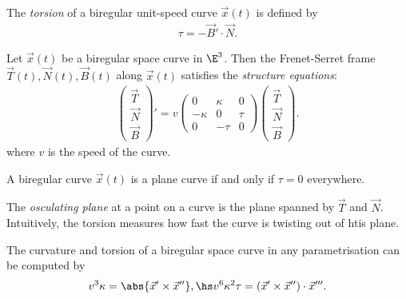 \documentclass{article}
\begin{document}
\begin{definition}
    The \emph{torsion} of a biregular unit-speed curve $\vec x(t)$ is defined by
    \begin{align*}
        \tau = - \vec B' \cdot \vec N.
    \end{align*}
\end{definition}

\begin{theorem}
    Let $\vec x(t)$ be a biregular space curve in $\E^3$. Then the Frenet-Serret
    frame $\vec T(t), \vec N(t), \vec B(t)$ along $\vec x(t)$ satisfies the
    \emph{structure equations}:
    \begin{align*}
        \begin{pmatrix}
            \vec T \\
            \vec N \\
            \vec B
        \end{pmatrix}'
        = v\begin{pmatrix}
            0       & \kappa & 0    \\
            -\kappa & 0      & \tau \\
            0       & -\tau  & 0
        \end{pmatrix}
        \begin{pmatrix}
            \vec T \\
            \vec N \\
            \vec B
        \end{pmatrix}.
    \end{align*}
    where $v$ is the speed of the curve.
\end{theorem}

\begin{theorem}
    A biregular curve $\vec x(t)$ is a plane curve if and only if $\tau=0$ everywhere.
\end{theorem}

\begin{definition}
    The \emph{osculating plane} at a point on a curve is the plane spanned by $\vec T$ and
    $\vec N$. Intuitively, the torsion measures how fast the curve is twisting out of htis plane.
\end{definition}

\begin{theorem}
    The curvature and torsion of a biregular space curve in any parametrisation can be
    computed by
    \begin{align*}
        v^3\kappa = \abs{\vec x' \times \vec x''},\hs
        v^6\kappa^2\tau = (\vec x' \times \vec x'') \cdot \vec x'''.
    \end{align*}
\end{theorem}
\end{document}
